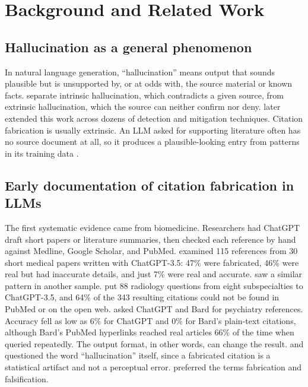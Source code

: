 \documentclass[acmsmall,screen]{acmart}
\begin{document}
\section{Background and Related Work}\label{sec:background}
\subsection{Hallucination as a general phenomenon}
In natural language generation, ``hallucination'' means output that sounds plausible but is unsupported by, or at odds with, the source material or known facts. \citet{ji2023} separate intrinsic hallucination, which contradicts a given source, from extrinsic hallucination, which the source can neither confirm nor deny. \citet{huang2023} later extended this work across dozens of detection and mitigation techniques. Citation fabrication is usually extrinsic. An LLM asked for supporting literature often has no source document at all, so it produces a plausible-looking entry from patterns in its training data \citep{agrawal2023}.

\subsection{Early documentation of citation fabrication in LLMs}
The first systematic evidence came from biomedicine. Researchers had ChatGPT draft short papers or literature summaries, then checked each reference by hand against Medline, Google Scholar, and PubMed. \citet{bhattacharyya2023} examined 115 references from 30 short medical papers written with ChatGPT-3.5: 47\% were fabricated, 46\% were real but had inaccurate details, and just 7\% were real and accurate. \citet{athaluri2023} saw a similar pattern in another sample. \citet{wagner2024} put 88 radiology questions from eight subspecialties to ChatGPT-3.5, and 64\% of the 343 resulting citations could not be found in PubMed or on the open web. \citet{mcgowan2023} asked ChatGPT and Bard for psychiatry references. Accuracy fell as low as 6\% for ChatGPT and 0\% for Bard's plain-text citations, although Bard's PubMed hyperlinks reached real articles 66\% of the time when queried repeatedly. The output format, in other words, can change the result. \citet{goddard2023} and \citet{emsley2023} questioned the word ``hallucination'' itself, since a fabricated citation is a statistical artifact and not a perceptual error. \citet{emsley2023} preferred the terms fabrication and falsification.
\end{document}
